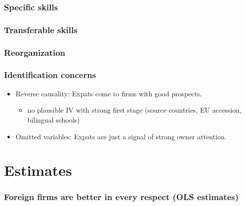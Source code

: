 \documentclass[aspectratio=169,compress,mathserif]{beamer}
\newcommand{\regressiontable}[1]{}
\newcommand{\scaffolding}{\draw [->] (0,-0.5) --(14,-0.5);
\draw[thick] (7,-0.5)--(10,-0.5);

\foreach \x in {1,4,7,10,13}
\draw(\x cm,3pt - 0.5cm) -- (\x cm, -3pt - 0.5cm);
}
\begin{document}
\begin{frame}\frametitle{Specific skills}\hypertarget{Specific skills}{}


\end{frame}



\begin{frame}\frametitle{Transferable skills}\hypertarget{Transferable skills}{}


\end{frame}



\begin{frame}\frametitle{Reorganization}\hypertarget{Reorganization}{}


\end{frame}



\begin{frame}\frametitle{Identification concerns}\hypertarget{Identification concerns}{}
\begin{itemize}
\item Reverse causality: Expats come to firms with good prospects.
\begin{itemize}
\item no plausible IV with strong first stage (source countries, EU accession, bilingual schools)
\end{itemize}

\item Omitted variables: Expats are just a signal of strong owner attention.




\end{itemize}
\end{frame}







\section{Estimates}\hypertarget{Estimates}{}
\begin{frame}\frametitle{Foreign firms are better in every respect (OLS estimates)}\hypertarget{Foreign firms are better in every respect (OLS estimates)}{}
\regressiontable{baseline_OLS}


\end{frame}
\end{document}
